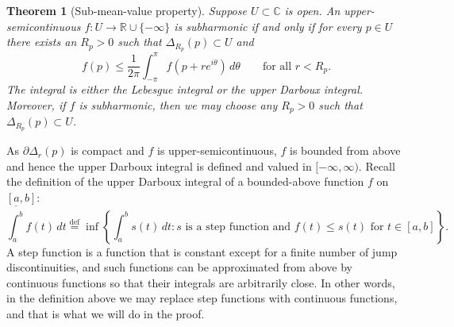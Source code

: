 \documentclass[12pt,openany]{book}
\newcommand{\C}{{\mathbb{C}}}
\newcommand{\R}{{\mathbb{R}}}
\theoremstyle{plain}
\newtheorem{thm}{Theorem}[section]
\theoremstyle{remark}
\theoremstyle{definition}
\theoremstyle{exercise}
\theoremstyle{example}
\begin{document}
\begin{thm}[Sub-mean-value property]
\label{thm:submeanprop}
Suppose $U \subset \C$ is open.
An upper-semicontinuous $f \colon U \to \R \cup \{ -\infty \}$
is subharmonic if and only if
for every $p \in U$ there exists an $R_p > 0$ such that
$\Delta_{R_p}(p) \subset U$ and
\begin{equation*}
f(p) \leq \frac{1}{2\pi} \int_{-\pi}^{\pi} f(p+re^{i\theta})\, d\theta
\qquad \text{for all } r < R_p .
\end{equation*}
The integral is either the Lebesgue integral or the upper Darboux integral.
Moreover, if $f$ is subharmonic, then we may choose any
$R_p > 0$ such that $\Delta_{R_p}(p) \subset U$.
\end{thm}

As $\partial \Delta_r(p)$ is compact and $f$ is upper-semicontinuous,
$f$ is bounded from above and hence the upper Darboux integral is defined
and valued in $[-\infty,\infty)$.
Recall the definition of the upper Darboux integral of a bounded-above
function $f$ on $[a,b]$:
\begin{equation*}
\overline{\int_a^b} f(t) \,dt
\overset{\text{def}}{=}
\inf \left\{ \int_a^b s(t) \, dt : s
\text{ is a step function and } f(t) \leq s(t) \text{ for } t \in
[a,b] \right\} .
\end{equation*}
A step function is a function that is constant except for a finite
number of jump discontinuities, and such functions
can be approximated from above by continuous functions
so that their integrals are arbitrarily close.
In other words, in the definition above we may replace
step functions with continuous functions, and that is what we will do in
the proof.
\end{document}
